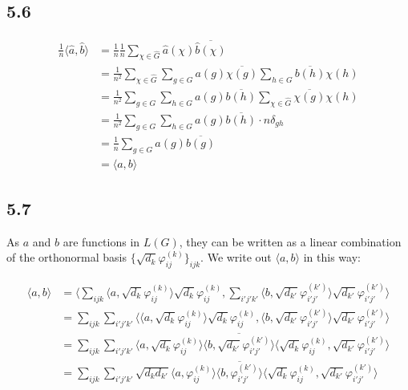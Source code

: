 \documentclass[12pt]{article}
\begin{document}
\subsection*{5.6}

\begin{equation*}
\begin{split}
\frac{1}{n} \langle \widehat{a}, \widehat{b} \rangle
&= \frac{1}{n} \frac{1}{n} \sum_{\chi \in \widehat{G}}
    \widehat{a}(\chi) \overline{\widehat{b}(\chi)} \\
&= \frac{1}{n^2} \sum_{\chi \in \widehat{G}} \sum_{g \in G} a(g) \overline{\chi(g)} \sum_{h \in G} \overline{b(h)} \chi(h) \\
&= \frac{1}{n^2}  \sum_{g \in G} \sum_{h \in G} a(g) \overline{b(h)} \sum_{\chi \in \widehat{G}} \overline{\chi(g)} \chi(h) \\
&= \frac{1}{n^2}  \sum_{g \in G} \sum_{h \in G} a(g) \overline{b(h)} \cdot n \delta_{gh} \\
&= \frac{1}{n}  \sum_{g \in G} a(g) \overline{b(g)} \\
&= \langle a, b \rangle
\end{split}
\end{equation*}


\subsection*{5.7}

As $a$ and $b$ are functions in $L(G)$, they can be written as a linear combination of the orthonormal basis $\{ \sqrt{d_k} \varphi_{ij}^{(k)}\}_{ijk}$. We write out $\langle a, b \rangle$ in this way:

\begin{align*}
    \langle a, b \rangle &=
    \langle \sum_{ijk} \langle a, \sqrt{d_k} \varphi_{ij}^{(k)} \rangle \sqrt{d_k} \varphi_{ij}^{(k)}, \sum_{i'j'k'} \langle b, \sqrt{d_{k'}} \varphi_{i'j'}^{(k')} \rangle \sqrt{d_{k'}} \varphi_{i'j'}^{(k')} \rangle \\
    &= \sum_{ijk} \sum_{i'j'k'} \langle \langle a, \sqrt{d_k} \varphi_{ij}^{(k)} \rangle \sqrt{d_k} \varphi_{ij}^{(k)}, \langle b, \sqrt{d_{k'}} \varphi_{i'j'}^{(k')} \rangle \sqrt{d_{k'}} \varphi_{i'j'}^{(k')} \rangle \\
    &= \sum_{ijk} \sum_{i'j'k'} \langle a, \sqrt{d_k} \varphi_{ij}^{(k)} \rangle \overline{ \langle b, \sqrt{d_{k'}} \varphi_{i'j'}^{(k')} \rangle } \langle \sqrt{d_k} \varphi_{ij}^{(k)}, \sqrt{d_{k'}} \varphi_{i'j'}^{(k')} \rangle \\
    &= \sum_{ijk} \sum_{i'j'k'} \sqrt{d_{k} d_{k'}} \langle a, \varphi_{ij}^{(k)} \rangle \overline{ \langle b, \varphi_{i'j'}^{(k')} \rangle } \langle \sqrt{d_{k}} \varphi_{ij}^{(k)}, \sqrt{d_{k'}} \varphi_{i'j'}^{(k')} \rangle
\end{align*}
\end{document}
